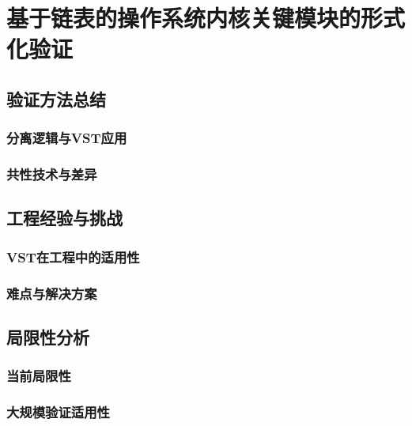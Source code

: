 \chapter{基于链表的操作系统内核关键模块的形式化验证}
\section{验证方法总结}
\subsection{分离逻辑与VST应用}
\subsection{共性技术与差异}
\section{工程经验与挑战}
\subsection{VST在工程中的适用性}
\subsection{难点与解决方案}
\section{局限性分析}
\subsection{当前局限性}
\subsection{大规模验证适用性}